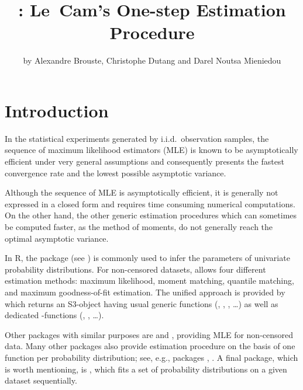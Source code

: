 \title{ : Le~Cam's One-step Estimation Procedure}
\author{by Alexandre Brouste, Christophe Dutang and Darel Noutsa Mieniedou}

\maketitle


\section{Introduction}

In the statistical experiments generated by i.i.d.~observation samples, the sequence of maximum likelihood estimators (MLE) is known to be asymptotically efficient under very general assumptions and consequently presents the fastest convergence rate and the lowest possible asymptotic variance.

Although the sequence of MLE is asymptotically efficient, it is generally not expressed in a closed form and requires time consuming numerical computations. On the other hand, the other generic estimation procedures which can sometimes be computed faster, as the method of moments, do not generally reach the optimal asymptotic variance.

In R, the package  (see \cite{fitdistrplus15}) is commonly used to infer the parameters 
of univariate probability distributions.
For non-censored datasets,  allows four  different  estimation  methods: 
maximum likelihood, moment matching, quantile matching, and maximum goodness-of-fit estimation.
The unified approach is provided by  which returns an S3-object having usual generic functions
(, , , \dots) as well as dedicated -functions
(, , \dots).

Other packages with similar purposes are   and , 
providing MLE for non-censored data. Many other packages also provide estimation procedure on the 
basis of one function per probability distribution; see, e.g., packages , .
A final package, which is worth mentioning, is , which fits a set of probability distributions 
on a given dataset sequentially.

